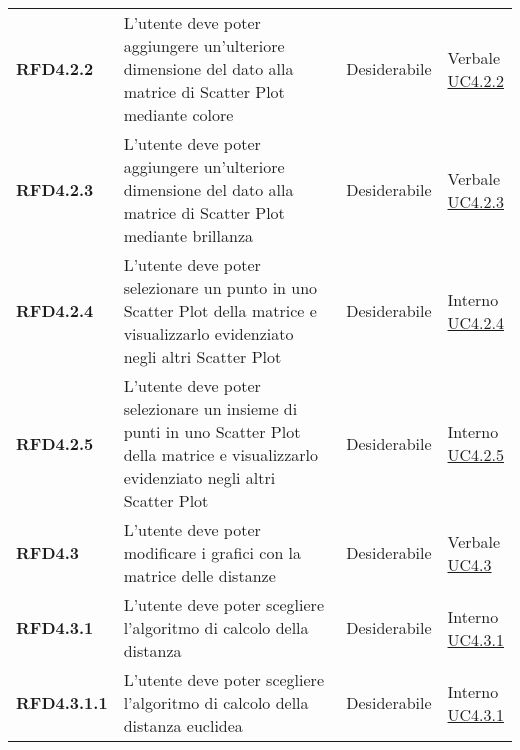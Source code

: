 \begin{longtable}[H]{| >{\raggedright\bfseries}m{20mm} | >{\raggedright}m{90mm} | >{\centering}m{25mm} | >{\centering\arraybackslash}m{30mm}|}
    RFD4.2.2
     & L'utente deve poter aggiungere un'ulteriore dimensione del dato alla matrice di Scatter Plot mediante colore
     & Desiderabile
     & \makecell{ Verbale                                                                                                \\ \hyperref[par:uc4.2.2]{UC4.2.2} }\\

    RFD4.2.3
     & L'utente deve poter aggiungere un'ulteriore dimensione del dato alla matrice di Scatter Plot mediante brillanza
     & Desiderabile
     & \makecell{ Verbale                                                                                                \\ \hyperref[par:uc4.2.3]{UC4.2.3} }\\

    RFD4.2.4
     & L'utente deve poter selezionare un punto in uno Scatter Plot della matrice e visualizzarlo evidenziato negli
    altri Scatter Plot
     & Desiderabile
     & \makecell{ Interno                                                                                                \\ \hyperref[par:uc4.2.4]{UC4.2.4} }\\

    RFD4.2.5
     & L'utente deve poter selezionare un insieme di punti in uno Scatter Plot della matrice e visualizzarlo evidenziato
    negli altri Scatter Plot
     & Desiderabile
     & \makecell{ Interno                                                                                                \\ \hyperref[par:uc4.2.5]{UC4.2.5} }\\

    RFD4.3
     & L'utente deve poter modificare i grafici con la matrice delle distanze
     & Desiderabile
     & \makecell{ Verbale                                                                                                \\ \hyperref[ssub:uc4.3]{UC4.3} }\\

    RFD4.3.1
     & L'utente deve poter scegliere l'algoritmo di calcolo della distanza
     & Desiderabile
     & \makecell{ Interno                                                                                                \\ \hyperref[par:uc4.3.1]{UC4.3.1} }\\

    RFD4.3.1.1
     & L'utente deve poter scegliere l'algoritmo di calcolo della distanza euclidea
     & Desiderabile
     & \makecell{ Interno                                                                                                \\ \hyperref[par:uc4.3.1]{UC4.3.1} }\\


\end{longtable}
